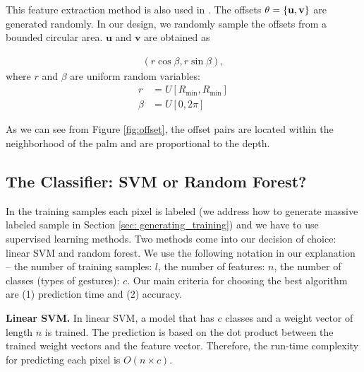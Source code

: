 This feature extraction method is also used in \cite{shotton2011}. The offsets $\theta=\{\bf{u}, \bf{v} \}$ are generated randomly. In our design, we randomly sample the offsets from a bounded circular area. $\textbf{u}$ and $\textbf{v}$ are obtained as

\cutequation
\begin{align}
\label{enq: offest}
 (r \cos \beta, r \sin \beta),
\end{align}
where $r$ and $\beta$ are uniform random variables:
\cutequation
\begin{align}
 r &= U[R_{\text{min}}, R_{\text{min}}]
 \label{eqn: radius} 
 \\
 \beta &= U[0, 2\pi]
\end{align}

As we can see from Figure \ref{fig:offset}, the offset pairs are located within the neighborhood of the palm and are proportional to the depth.

\cutsection
\subsection{The Classifier: SVM or Random Forest?}
\cutsection

In the training samples each pixel is labeled (we address how to generate massive labeled sample in Section \ref{sec: generating_training}) and we have to use supervised learning methods. Two methods come into our decision of choice: linear SVM and random forest. We use the following notation in our explanation -- the number of training samples: $l$, the number of features: $n$, the number of classes (types of gestures): $c$. Our main criteria for choosing the best algorithm are (1) prediction time and (2) accuracy.

\textbf{Linear SVM.} In linear SVM, a model that has $c$ classes and a weight vector of length $n$ is trained. The prediction is based on the dot product between the trained weight vectors and the feature vector. Therefore, the run-time complexity for predicting each pixel is $O(n\times c)$.


